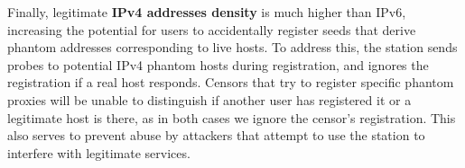 \documentclass[sigconf,anonymous]{acmart}
\newcommand{\note}[2]{\hl{[\textbf{#1:} #2]}\xspace}
\newcommand{\nikita}[1]{\note{nikita}{#1}}
\begin{document}
Finally, legitimate \textbf{IPv4 addresses density} is much higher than IPv6,
increasing the potential for users to accidentally register seeds that derive
phantom addresses corresponding to live hosts. To address this, the station
sends probes to potential IPv4 phantom hosts during registration, and ignores the
registration if a real host responds. Censors that try to register specific
phantom proxies will be unable to distinguish if another user has registered it
or a legitimate host is there, as in both cases we ignore the censor's
registration. This also serves to prevent abuse by attackers that attempt
to use the \scheme station to interfere with legitimate services.




\end{document}
